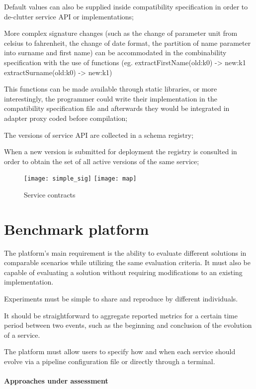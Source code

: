 Default values can also be supplied inside compatibility specification in order to de-clutter service API or implementations;

More complex signature changes (such as the change of parameter unit from celsius to fahrenheit, the change of date format, the partition of name parameter into surname and first name)
can be accommodated in the combinability specification with the use of functions (eg. extractFirstName(old:k0) -> new:k1  extractSurname(old:k0) -> new:k1)

This functions can be made available through static libraries, or more interestingly, the programmer could write their implementation in the compatibility specification file
and afterwards they would be integrated in adapter proxy coded before compilation;

The versions of service API are collected in a schema registry;

When a new version is submitted for deployment the registry is consulted in order to obtain the set of all active versions of the same service;

\begin{figure}[htbp]
    \centering
    \texttt{[image: simple\_sig]}
    \texttt{[image: map]}
    \caption{Service contracts}
    \label{fig:simple}
\end{figure}

\section{Benchmark platform} %
\label{sec:benchmark_platform}

The platform's main requirement is the ability to evaluate different solutions in comparable scenarios while utilizing the same evaluation criteria. It must also be capable of evaluating a solution without requiring modifications to an existing implementation.

Experiments must be simple to share and reproduce by different individuals.

It should be straightforward to aggregate reported metrics for a certain time period between two events, such as the beginning and conclusion of the evolution of a service.

The platform must allow users to specify how and when each service should evolve via a pipeline configuration file or directly through a terminal.

\paragraph{Approaches under assessment}


